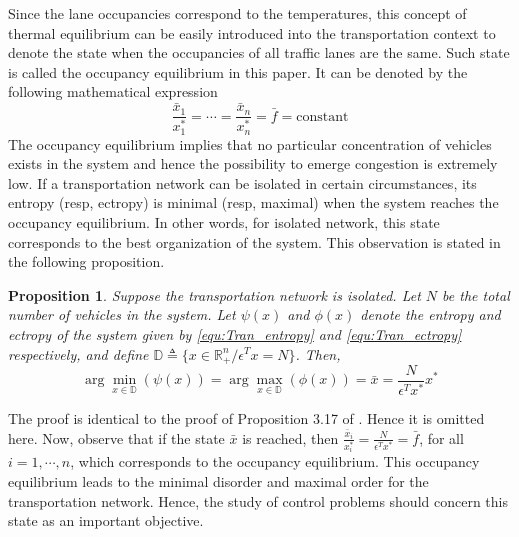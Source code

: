 \documentclass[trsc,nonblindrev]{informs3} %
\renewcommand{\vec}[1]{#1}
\newtheorem{prpn}{Proposition}
\begin{document}
Since the lane occupancies correspond to the temperatures, this
concept of thermal equilibrium can be easily introduced into the
transportation context to denote the state when the occupancies of
all traffic lanes are the same. Such state is called the occupancy
equilibrium in this paper. It can be denoted by the following
mathematical expression
\begin{equation}\label{equ:equilibrium}
\frac{\bar{x}_1}{x_1^*}=\cdots=\frac{\bar{x}_n}{x_n^*}=\bar{f}=\text{
constant}
\end{equation}
The occupancy equilibrium implies that no particular concentration of
vehicles exists in the system and hence the possibility to emerge
congestion is extremely low.
If a transportation network can be isolated in certain circumstances,
its entropy (resp, ectropy) is minimal (resp, maximal) when
the system reaches the occupancy equilibrium. In other words, for
isolated network, this state corresponds to the best organization of
the system. This observation is stated in the following proposition.

\begin{prpn}\label{thm:entropy_equilibrium}
Suppose the transportation network is isolated. Let $N$ be the total
number of vehicles in the system. Let $\psi(\vec{x})$ and
$\phi(\vec{x})$ denote the entropy and ectropy of the system  given
by \eqref{equ:Tran_entropy} and \eqref{equ:Tran_ectropy}
respectively, and define $\mathbb{D}\triangleq
\{\vec{x}\in\mathbb{R}^n_+/\vec{\epsilon}^T\vec{x}=N\}$. Then,
\begin{equation}\label{equ:entropy_equilibrium}
\arg\min_{\vec{x}\in\mathbb{D}}(\psi(\vec{x})) =
\arg\max_{\vec{x}\in\mathbb{D}}(\phi(\vec{x})) = \bar{\vec{x}} =
\frac{N}{\vec{\epsilon}^T\vec{x}^*}\vec{x}^*
\end{equation}
\end{prpn}
The proof is identical to the proof of Proposition 3.17
of \citet{haddad_thermodynamic_2005}. Hence it is omitted here.
\endproof
Now, observe that if the state $ \bar{\vec{x}}$ is reached, then
$\frac{\bar{x}_i}{x_i^*}=\frac{N}{\vec{\epsilon}^T\vec{x}^*}=\bar{f}$,
for all $i=1,\cdots, n$, which corresponds to the occupancy
equilibrium. This occupancy equilibrium leads to the minimal disorder
and maximal order for the transportation network. Hence, the study of
control problems should concern this state as an important objective.

\end{document}
